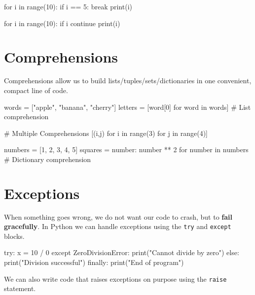 \begin{exampleblock}
\begin{codeblock}[language=python]
for i in range(10):
    if i == 5:
        break
    print(i)

for i in range(10):
    if i %
        continue
    print(i)
\end{codeblock}
\end{exampleblock}



\section{Comprehensions}

Comprehensions allow us to build lists/tuples/sets/dictionaries in one convenient, compact line of code. 

\begin{codeblock}[language=python]
    words = ["apple", "banana", "cherry"]
    letters = [word[0] for word in words] # List comprehension
\end{codeblock}

\begin{codeblock}[language=python]
    # Multiple Comprehensions
    [(i,j) for i in range(3) for j in range(4)]
\end{codeblock}

\begin{codeblock}[language=python]
    numbers = [1, 2, 3, 4, 5]
    squares = {number: number ** 2 for number in numbers} # Dictionary comprehension
\end{codeblock}


\section{Exceptions}

When something goes wrong, we do not want our code to crash, but to \textbf{fail gracefully}. 
In Python we can handle exceptions using the \texttt{try} and \texttt{except} blocks.

\begin{exampleblock}
\begin{codeblock}[language=python]
try:
    x = 10 / 0
except ZeroDivisionError:
    print("Cannot divide by zero")
else:
    print("Division successful")
finally:
    print("End of program")
\end{codeblock}
\end{exampleblock}

We can also write code that raises exceptions on purpose using the \texttt{raise} statement.

